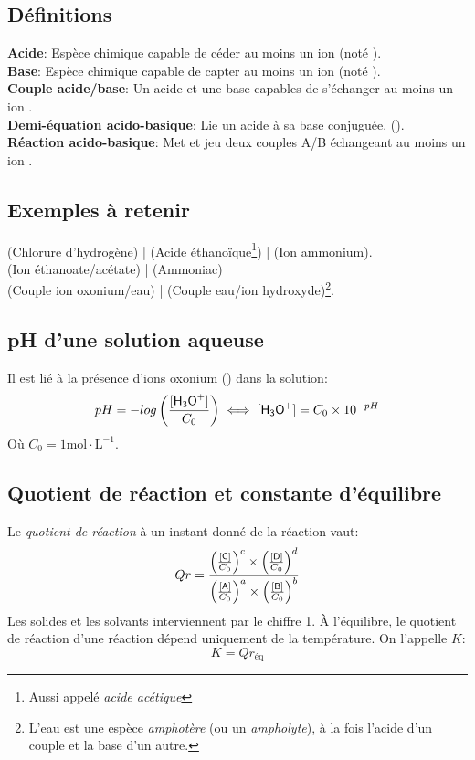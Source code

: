\documentclass[a5paper,10pt]{article}
\begin{document}
\subsection{Définitions}
\textbf{Acide}: Espèce chimique capable de céder au moins un ion  (noté \textbf{}).\\
\textbf{Base}: Espèce chimique capable de capter au moins un ion  (noté \textbf{}).\\
\textbf{Couple acide/base}: Un acide et une base capables de s'échanger au moins un ion .\\
\textbf{Demi-équation acido-basique}: Lie un acide à sa base conjuguée. (\textbf{}).\\
\textbf{Réaction acido-basique}: Met et jeu deux couples A/B échangeant au moins un ion .

\subsection{Exemples à retenir}
\textbf{} (Chlorure d'hydrogène) | \textbf{} (Acide éthanoïque\footnote{Aussi appelé \textit{acide acétique}}) | \textbf{} (Ion ammonium).\\
\textbf{} (Ion éthanoate/acétate) | \textbf{} (Ammoniac)\\
\textbf{} (Couple ion oxonium/eau) | \textbf{} (Couple eau/ion hydroxyde)\footnote{L'eau est une espèce \textit{amphotère} (ou un \textit{ampholyte}), à la fois l'acide d'un couple et la base d'un autre.}.

\subsection{pH d'une solution aqueuse}
Il est lié à la présence d'ions oxonium () dans la solution:
$$pH=-log\left(\frac{[\text{\ce{H3O+}}]}{C_0}\right) \iff [\text{\ce{H3O+}}]=C_0\times 10^{-pH}$$
Où $C_0=1\text{mol}\cdot \text{L}^{-1}$.

\subsection{Quotient de réaction et constante d'équilibre}
Le \textit{quotient de réaction} à un instant donné de la réaction  vaut:
$$Qr=\frac{\left(\frac{[\text{\ce{C}}]}{C_0}\right)^c \times \left(\frac{[\text{\ce{D}}]}{C_0}\right)^d}{\left(\frac{[\text{\ce{A}}]}{C_0}\right)^a \times \left(\frac{[\text{\ce{B}}]}{C_0}\right)^b}$$
Les solides et les solvants interviennent par le chiffre 1. À l'équilibre, le quotient de réaction d'une réaction dépend uniquement de la température. On l'appelle $K$:
$$K=Qr_{\text{éq}}$$
\end{document}

